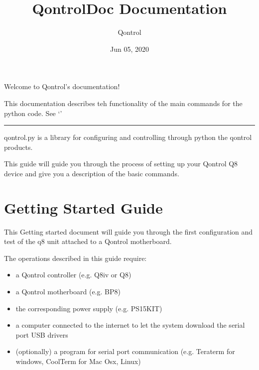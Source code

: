 \documentclass[letterpaper,10pt,english]{sphinxmanual}
\title{QontrolDoc Documentation}
\date{Jun 05, 2020}
\author{Qontrol}
\begin{document}
\pagestyle{empty}
\sphinxmaketitle
\pagestyle{plain}
\sphinxtableofcontents
\pagestyle{normal}
\label{\detokenize{index::doc}}
Welcome to Qontrol’s documentation!

This documentation describes teh functionality of the main commands for the python  code.
See ‘’


\bigskip\hrule\bigskip




qontrol.py is a library for configuring and controlling through python the qontrol products.

This guide will guide you through the process of setting up your Qontrol Q8 device and give you a description of the basic commands.


\chapter{Getting Started Guide}
\label{\detokenize{guide/getting_started:getting-started-guide}}\label{\detokenize{guide/getting_started::doc}}
This Getting started document will guide you through the first configuration and test of the q8 unit
attached to a Qontrol motherboard.

The operations described in this guide require:
\begin{itemize}
\item {} 
a Qontrol controller (e.g. Q8iv or Q8)

\item {} 
a Qontrol motherboard (e.g. BP8)

\item {} 
the corresponding power supply (e.g. PS15KIT)

\item {} 
a computer connected to the internet to let the system download the serial port USB drivers

\item {} 
(optionally) a program for serial port communication (e.g. Teraterm for windows, CoolTerm for Mac Osx, Linux)

\end{itemize}
\end{document}
